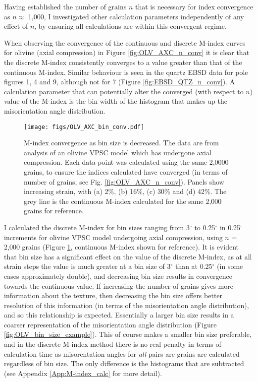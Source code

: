 \documentclass[a4paper,12pt,twoside]{report}
\numberwithin{equation}{chapter}
\begin{document}
Having established the number of grains $n$ that is necessary for index convergence as $n \approx$ 1,000, I  investigated other calculation parameters independently of any effect of $n$, by ensuring all calculations are within this convergent regime. 

When observing the convergence of the continuous and discrete M-index curves for olivine (axial compression) in Figure \ref{fig:OLV_AXC_n_conv} it is clear that the discrete M-index consistently converges to a value greater than that of the continuous M-index. Similar behaviour is seen in the quartz EBSD data for pole figures 1, 4 and 9, although not for 7 (Figure \ref{fig:EBSD_QTZ_n_conv}). A calculation parameter that can potentially alter the converged (with respect to $n$) value of the M-index is the bin width of the histogram that makes up the misorientation angle distribution.   

\begin{figure}[h!]
  \centering
    \texttt{[image: figs/OLV\_AXC\_bin\_conv.pdf]}
  \caption[Convergence with bin size (olivine)]{M-index convergence as bin size is decreased. The data are from analysis of an olivine VPSC model which has undergone axial compression. Each data point was calculated using the same 2,0000 grains, to ensure the indices calculated have converged (in terms of number of grains, see Fig. \ref{fig:OLV_AXC_n_conv}). Panels show increasing strain, with (a) 2\%, (b) 16\%, (c) 30\% and (d) 42\%. The grey line is the continuous M-index calculated for the same 2,000 grains for reference.}
  \label{fig:OLV_AXC_b_conv}
\end{figure}  

I calculated the discrete M-index for bin sizes ranging from 3$^\circ$ to 0.25$^\circ$ in 0.25$^\circ$ increments for olivine VPSC model undergoing axial compression, using $n$ = 2,000 grains (Figure \ref{fig:OLV_AXC_b_conv}, continuous M-index shown for reference). It is evident that bin size has a significant effect on the value of the discrete M-index, as at all strain steps the value is much greater at a bin size of 3$^\circ$ than at 0.25$^\circ$ (in some cases approximately double), and decreasing bin size results in convergence towards the continuous value. If increasing the number of grains gives more information about the texture, then decreasing the bin size offers better resolution of this information (in terms of the misorientation angle distribution), and so this relationship is expected. Essentially a larger bin size results in a coarser representation of the misorientation angle distribution (Figure \ref{fig:OLV_bin_size_example}). This of course makes a smaller bin size preferable, and in the discrete M-index method there is no real penalty in terms of calculation time as misorentation angles for \emph{all} pairs are grains are calculated regardless of bin size. The only difference is the histograms that are subtracted (see Appendix \ref{App:M-index_calc} for more detail).
\end{document}
